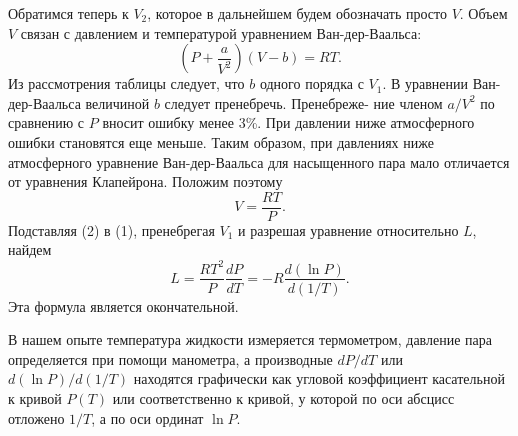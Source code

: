 \documentclass[a4paper, 12pt]{article}
\begin{document}
Обратимся теперь к $V_2$, которое в дальнейшем будем обозначать
просто $V$. Объем $V$ связан с давлением и температурой уравнением
Ван-дер-Ваальса:
\[
	\left( P + \frac{a}{V^2} \right) \left( V - b \right) = RT.
\]
Из рассмотрения таблицы следует, что $b$ одного порядка с $V_1$. В уравнении Ван-дер-Ваальса величиной $b$ следует пренебречь. Пренебреже-
ние членом $a/V^2$ по сравнению с $P$ вносит ошибку менее 3\%. При давлении ниже атмосферного ошибки становятся еще меньше. Таким образом, при давлениях ниже атмосферного уравнение Ван-дер-Ваальса для насыщенного пара мало отличается от уравнения Клапейрона.
Положим поэтому
\begin{equation}
	V = \frac{RT}{P}.
\end{equation}
Подставляя (2) в (1), пренебрегая $V_1$ и разрешая уравнение относительно
$L$, найдем
\[
	L = \frac{RT^2}{P} \frac{dP}{dT} = -R \frac{d(\ln P)}{d(1/T)}.
\]
Эта формула является окончательной.

В нашем опыте температура жидкости измеряется термометром, давление пара определяется при помощи манометра, а производные $dP/dT$ или $d(\ln P)/d(1/T)$ находятся графически как угловой коэффициент касательной к кривой $P(T)$ или соответственно к кривой, у которой по оси абсцисс отложено $1/T$, а по оси ординат $\ln P$.
\end{document}
